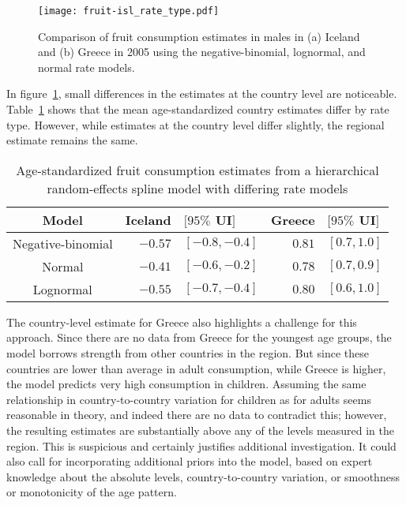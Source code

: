     \begin{figure}[h]
        \begin{center}
            \texttt{[image: fruit-isl\_rate\_type.pdf]}
            \caption[Comparison of fruit consumption estimates using different
              rate models in Iceland and Greece.]{Comparison of fruit 
              consumption estimates in males in
              (a) Iceland and (b) Greece in 2005 using the
              negative-binomial, lognormal, and normal rate models.}
            \label{fig:app-fruit countries}
        \end{center}
    \end{figure}

In figure~\ref{fig:app-fruit countries},
small differences in the estimates at the country level are noticeable.
Table~\ref{tab:app-fruit rfx} shows that the mean age-standardized
country estimates differ by rate type.  However, while estimates at
the country level differ slightly, the regional estimate remains the same.

    \begin{table}[h]
        \begin{center}
        \begin{tabular}{|c|rl|rl|}
            \hline
                Model & Iceland&$[95\%$ UI$]$ & Greece&$[95\%$ UI$]$ \\
            \hline
                Negative-binomial & $-0.57$&$ [-0.8, -0.4]$ & $0.81$&$ [0.7, 1.0]$ \\
                Normal & $-0.41$&$ [-0.6, -0.2]$ & $0.78$&$ [0.7, 0.9]$ \\
                Lognormal & $-0.55$& $[-0.7, -0.4]$ & $0.80$&$ [0.6, 1.0]$ \\
            \hline
        \end{tabular}
        \end{center}
        \caption{ Age-standardized fruit consumption estimates
          from a hierarchical random-effects spline model with differing
          rate models}
        \label{tab:app-fruit rfx}
    \end{table}

The country-level estimate for Greece also highlights a challenge for
this approach.  Since there are no data from Greece for the youngest
age groups, the model borrows strength from other countries in the
region.  But since these countries are lower than average in adult
consumption, while Greece is higher, the model predicts very high
consumption in children.  Assuming the same relationship in
country-to-country variation for children as for adults seems reasonable
in theory, and indeed there are no data to contradict this; however,
the resulting estimates are substantially above any of the levels
measured in the region.  This is suspicious and certainly justifies
additional investigation.  It could also call for incorporating
additional priors into the model, based on expert knowledge about the
absolute levels, country-to-country variation, or smoothness or
monotonicity of the age pattern.

